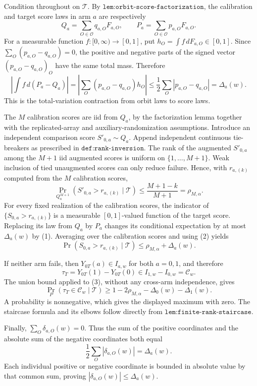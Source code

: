 Condition throughout on \(\mathcal T\). By \(\texttt{lem:orbit-score-factorization}\), the calibration and target score laws in arm \(a\) are respectively
\[Q_a=\sum_{O\in\mathcal O}q_{a,O}F_{a,O},\qquad P_a=\sum_{O\in\mathcal O}p_{a,O}F_{a,O}.\]
For a measurable function \(f:[0,\infty)\to[0,1]\), put \(h_O=\int f\,dF_{a,O}\in[0,1]\). Since \(\sum_O(p_{a,O}-q_{a,O})=0\), the positive and negative parts of the signed vector \((p_{a,O}-q_{a,O})_O\) have the same total mass. Therefore
\[\left|\int f\,d(P_a-Q_a)\right|=\left|\sum_O(p_{a,O}-q_{a,O})h_O\right|\le\frac12\sum_O|p_{a,O}-q_{a,O}|=\Delta_a(w).\tag{1}\]
This is the total-variation contraction from orbit laws to score laws.

The \(M\) calibration scores are iid from \(Q_a\), by the factorization lemma together with the replicated-array and auxiliary-randomization assumptions. Introduce an independent comparison score \(S'_{0,a}\sim Q_a\). Append independent continuous tie-breakers as prescribed in \(\texttt{def:rank-inversion}\). The rank of the augmented \(S'_{0,a}\) among the \(M+1\) iid augmented scores is uniform on \(\{1,\ldots,M+1\}\). Weak inclusion of tied unaugmented scores can only reduce failure. Hence, with \(r_{a,(k)}\) computed from the \(M\) calibration scores,
\[\Pr_{Q_a^{M+1}}(S'_{0,a}>r_{a,(k)}\mid\mathcal T)\le\frac{M+1-k}{M+1}=\rho_{M,\alpha}.\tag{2}\]
For every fixed realization of the calibration scores, the indicator of \(\{S_{0,a}>r_{a,(k)}\}\) is a measurable \([0,1]\)-valued function of the target score. Replacing its law from \(Q_a\) by \(P_a\) changes its conditional expectation by at most \(\Delta_a(w)\) by (1). Averaging over the calibration scores and using (2) yields
\[\Pr(S_{0,a}>r_{a,(k)}\mid\mathcal T)\le\rho_{M,\alpha}+\Delta_a(w).\tag{3}\]

If neither arm fails, then \(Y_{0T}(a)\in I_{a,w}\) for both \(a=0,1\), and therefore
\[\tau_T=Y_{0T}(1)-Y_{0T}(0)\in I_{1,w}-I_{0,w}=\mathcal C_w.\]
The union bound applied to (3), without any cross-arm independence, gives
\[\Pr_P(\tau_T\in\mathcal C_w\mid\mathcal T)\ge1-2\rho_{M,\alpha}-\Delta_0(w)-\Delta_1(w).\]
A probability is nonnegative, which gives the displayed maximum with zero. The staircase formula and its elbows follow directly from \(\texttt{lem:finite-rank-staircase}\).

Finally, \(\sum_O\delta_{a,O}(w)=0\). Thus the sum of the positive coordinates and the absolute sum of the negative coordinates both equal
\[\frac12\sum_O|\delta_{a,O}(w)|=\Delta_a(w).\]
Each individual positive or negative coordinate is bounded in absolute value by that common sum, proving \(|\delta_{a,O}(w)|\le\Delta_a(w)\).